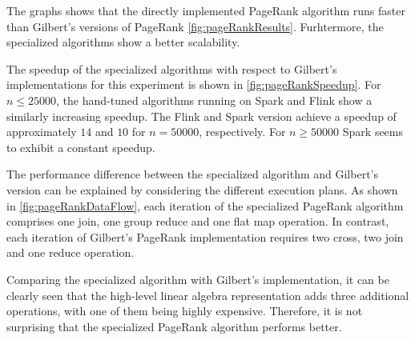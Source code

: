 The graphs shows that the directly implemented PageRank algorithm runs faster than Gilbert's versions of PageRank \cref{fig:pageRankResults}.
Furhtermore, the specialized algorithms show a better scalability.

The speedup of the specialized algorithms with respect to Gilbert's implementations for this experiment is shown in \cref{fig:pageRankSpeedup}.
For $n\le 25000$, the hand-tuned algorithms running on Spark and Flink show a similarly increasing speedup.
The Flink and Spark version achieve a speedup of approximately $14$ and $10$ for $n=50000$, respectively.
For $n\ge 50000$ Spark seems to exhibit a constant speedup.

The performance difference between the specialized algorithm and Gilbert's version can be explained by considering the different execution plans.
As shown in \cref{fig:pageRankDataFlow}, each iteration of the specialized PageRank algorithm comprises one join, one group reduce and one flat map operation.
In contrast, each iteration of Gilbert's PageRank implementation requires two cross, two join and one reduce operation.

Comparing the specialized algorithm with Gilbert's implementation, it can be clearly seen that the high-level linear algebra representation adds three additional operations, with one of them being highly expensive.
Therefore, it is not surprising that the specialized PageRank algorithm performs better.

